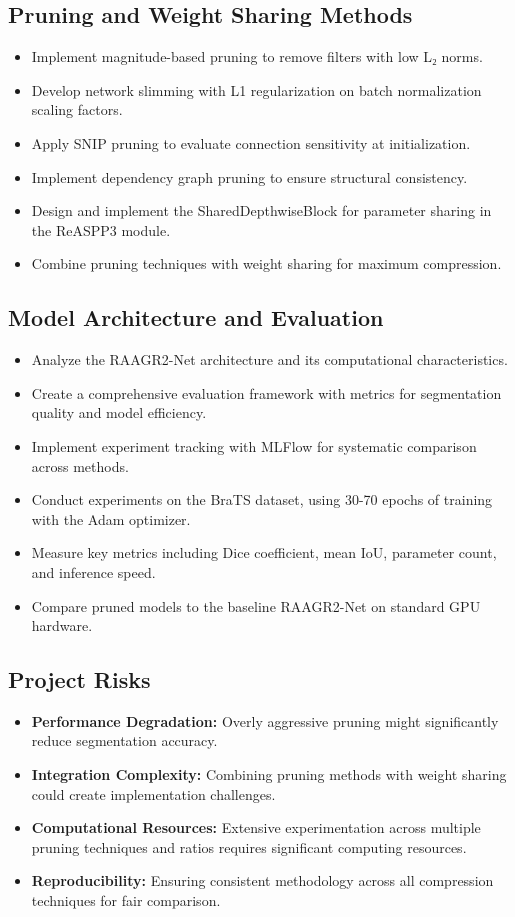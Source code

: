 \documentclass[conference]{IEEEtran}
\begin{document}
\subsection{Pruning and Weight Sharing Methods}
\begin{itemize}[label=--]
    \item Implement magnitude-based pruning to remove filters with low L₂ norms.
    \item Develop network slimming with L1 regularization on batch normalization scaling factors.
    \item Apply SNIP pruning to evaluate connection sensitivity at initialization.
    \item Implement dependency graph pruning to ensure structural consistency.
    \item Design and implement the SharedDepthwiseBlock for parameter sharing in the ReASPP3 module.
    \item Combine pruning techniques with weight sharing for maximum compression.
\end{itemize}

\subsection{Model Architecture and Evaluation}
\begin{itemize}[label=--]
    \item Analyze the RAAGR2-Net architecture and its computational characteristics.
    \item Create a comprehensive evaluation framework with metrics for segmentation quality and model efficiency.
    \item Implement experiment tracking with MLFlow for systematic comparison across methods.
    \item Conduct experiments on the BraTS dataset, using 30-70 epochs of training with the Adam optimizer.
    \item Measure key metrics including Dice coefficient, mean IoU, parameter count, and inference speed.
    \item Compare pruned models to the baseline RAAGR2-Net on standard GPU hardware.
\end{itemize}

\subsection{Project Risks}
\begin{itemize}[label=--]
    \item \textbf{Performance Degradation:} Overly aggressive pruning might significantly reduce segmentation accuracy.
    \item \textbf{Integration Complexity:} Combining pruning methods with weight sharing could create implementation challenges.
    \item \textbf{Computational Resources:} Extensive experimentation across multiple pruning techniques and ratios requires significant computing resources.
    \item \textbf{Reproducibility:} Ensuring consistent methodology across all compression techniques for fair comparison.
\end{itemize}
\end{document}
